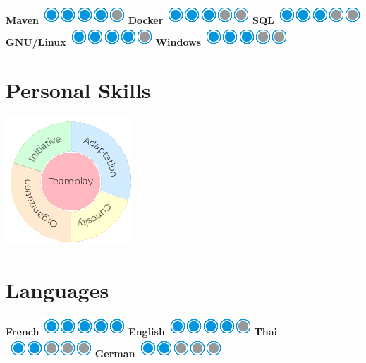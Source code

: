 \documentclass[]{friggeri-cv}
\begin{document}
\begin{aside}
    \textbf{Maven}\includegraphics[scale=0.40]{img/4puces.png}
    \textbf{Docker}\includegraphics[scale=0.40]{img/3puces.png}
    \textbf{SQL}\includegraphics[scale=0.40]{img/3puces.png}
    \textbf{GNU/Linux}\includegraphics[scale=0.40]{img/4puces.png}
    \textbf{Windows}\includegraphics[scale=0.40]{img/3puces.png}
    ~
  \section{Personal Skills}
  \hspace{1cm}
    \includegraphics[scale=0.62]{img/personal.png}
    ~
  \section{Languages}
  \hspace{1cm}
    \textbf{French}\includegraphics[scale=0.40]{img/5puces.png}
    \textbf{English}\includegraphics[scale=0.40]{img/4puces.png}
    \textbf{Thai}\includegraphics[scale=0.40]{img/2puces.png}
    \textbf{German}\includegraphics[scale=0.40]{img/2puces.png}
\end{aside}
\end{document}
